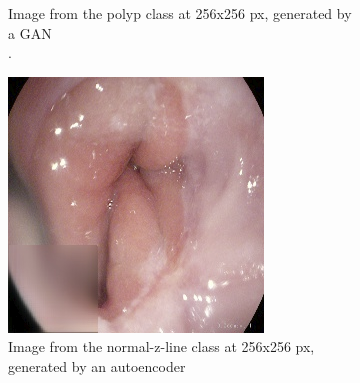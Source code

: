 \begin{figure}[t]
\begin{subfigure}[b]{0.4\textwidth}
            \caption[Hate to be this guy]%
            {{\small Image from the polyp class at 256x256 px, generated by a GAN \\.}}    
            \label{fig:polypGAN}
        \end{subfigure}
        \qquad\vfill%
        \begin{subfigure}[b]{0.4\textwidth}   
            \centering 
            \includegraphics[width=\textwidth]{experiments/figures/greensquare/zAE.png}
            \caption[]%
            {{\small Image from the normal-z-line class at 256x256 px, generated by an autoencoder }}    
            \label{fig:zAE}
        \end{subfigure}
        \qquad%
        \begin{subfigure}[b]{0.4\textwidth}   
            \centering 

\end{subfigure}
\end{figure}
